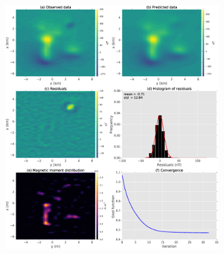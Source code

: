 \begin{figure}
	\centering
	\includegraphics[width=0.85\textwidth]{Fig/unidir_shallow_diff_test/results_compiled_LM_NNLS_magRM.eps}
	\caption{}
	\label{fig:unidir_shallow_diff_test}
\end{figure}
